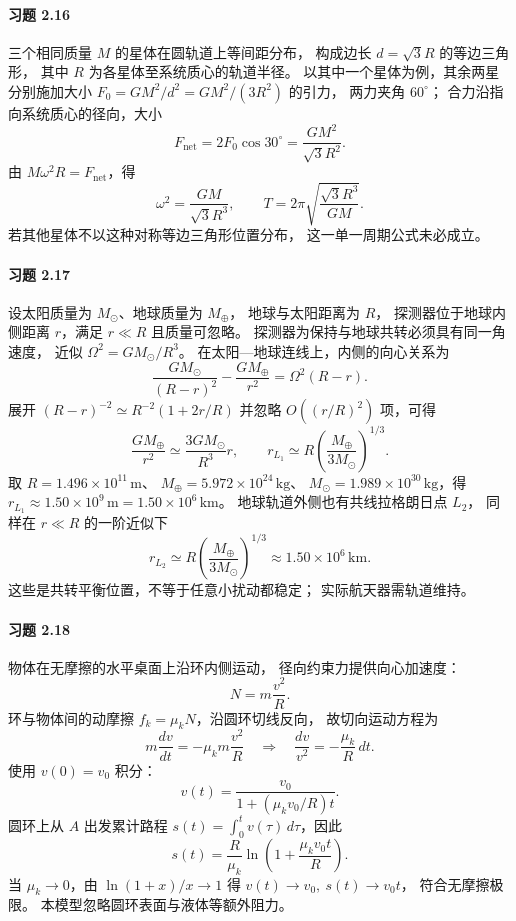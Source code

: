 \paragraph{习题 2.16}
三个相同质量 \(M\) 的星体在圆轨道上等间距分布，
构成边长 \(d=\sqrt3R\) 的等边三角形，
其中 \(R\) 为各星体至系统质心的轨道半径。
以其中一个星体为例，其余两星分别施加大小
\(F_0=GM^2/d^2=GM^2/(3R^2)\) 的引力，
两力夹角 \(60^\circ\)；
合力沿指向系统质心的径向，大小
\[
 F_{\mathrm{net}}=2F_0\cos30^\circ
 =\frac{GM^2}{\sqrt3R^2}.
\]
由 \(M\omega^2R=F_{\mathrm{net}}\)，得
\[
 \omega^2=\frac{GM}{\sqrt3R^3},\qquad
 \boxed{T=2\pi\sqrt{\frac{\sqrt3R^3}{GM}}}.
\]
若其他星体不以这种对称等边三角形位置分布，
这一单一周期公式未必成立。

\paragraph{习题 2.17}
设太阳质量为 \(M_\odot\)、地球质量为 \(M_\oplus\)，
地球与太阳距离为 \(R\)，
探测器位于地球内侧距离 \(r\)，满足
\(r\ll R\) 且质量可忽略。
探测器为保持与地球共转必须具有同一角速度，
近似 \(\Omega^2=GM_\odot/R^3\)。
在太阳—地球连线上，内侧的向心关系为
\[
 \frac{GM_\odot}{(R-r)^2}
 -\frac{GM_\oplus}{r^2}
 =\Omega^2(R-r).
\]
展开 \((R-r)^{-2}\simeq R^{-2}(1+2r/R)\)
并忽略 \(O((r/R)^2)\) 项，可得
\[
 \frac{GM_\oplus}{r^2}
 \simeq \frac{3GM_\odot}{R^3}r,
 \qquad
 \boxed{r_{L_1}\simeq
 R\left(\frac{M_\oplus}{3M_\odot}\right)^{1/3}}.
\]
取 \(R=1.496\times10^{11}\,\mathrm m\)、
\(M_\oplus=5.972\times10^{24}\,\mathrm{kg}\)、
\(M_\odot=1.989\times10^{30}\,\mathrm{kg}\)，得
\(r_{L_1}\approx1.50\times10^9\,\mathrm m
=1.50\times10^6\,\mathrm{km}\)。
地球轨道外侧也有共线拉格朗日点 \(L_2\)，
同样在 \(r\ll R\) 的一阶近似下
\[
 \boxed{r_{L_2}\simeq
 R\left(\frac{M_\oplus}{3M_\odot}\right)^{1/3}
 \approx1.50\times10^6\,\mathrm{km}}.
\]
这些是共转平衡位置，不等于任意小扰动都稳定；
实际航天器需轨道维持。

\paragraph{习题 2.18}
物体在无摩擦的水平桌面上沿环内侧运动，
径向约束力提供向心加速度：
\[
 N=m\frac{v^2}{R}.
\]
环与物体间的动摩擦
\(f_k=\mu_kN\)，沿圆环切线反向，
故切向运动方程为
\[
 m\frac{dv}{dt}=-\mu_km\frac{v^2}{R}
 \quad\Rightarrow\quad
 \frac{dv}{v^2}=-\frac{\mu_k}{R}\,dt.
\]
使用 \(v(0)=v_0\) 积分：
\[
 \boxed{v(t)=\frac{v_0}{1+(\mu_kv_0/R)t}}.
\]
圆环上从 \(A\) 出发累计路程
\(s(t)=\int_0^tv(\tau)\,d\tau\)，因此
\[
 \boxed{s(t)=\frac R{\mu_k}
 \ln\left(1+\frac{\mu_kv_0t}{R}\right)}.
\]
当 \(\mu_k\to0\)，由
\(\ln(1+x)/x\to1\) 得
\(v(t)\to v_0,\ s(t)\to v_0t\)，
符合无摩擦极限。
本模型忽略圆环表面与液体等额外阻力。

